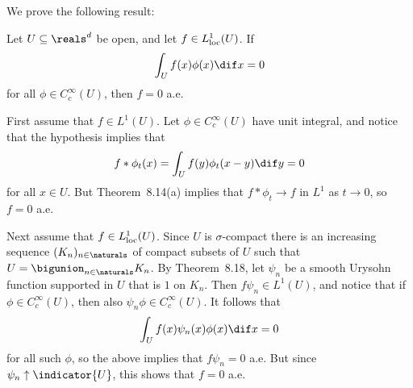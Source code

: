 \documentclass[article, a4paper, 11pt, oneside]{memoir}
\numberwithin{equation}{chapter}
\newenvironment{displaytheorem}{%
	\begin{displayquote}\itshape%
}{%
	\end{displayquote}%
}
\theoremstyle{nonumberplain}
\begin{document}
\begin{remarkbreak}
	We prove the following result:
	\begin{displaytheorem}
		Let $U \subseteq \reals^d$ be open, and let $f \in L^1_{\mathrm{loc}}(U)$. If
		\begin{equation*}
			\int_U f(x) \phi(x) \dif x
				= 0
		\end{equation*}
		for all $\phi \in C_c^\infty(U)$, then $f = 0$ a.e.
	\end{displaytheorem}
	First assume that $f \in L^1(U)$. Let $\phi \in C_c^\infty(U)$ have unit integral, and notice that the hypothesis implies that
	\begin{equation*}
		f * \phi_t(x)
			= \int_U f(y) \phi_t(x - y) \dif y
			= 0
	\end{equation*}
	for all $x \in U$. But Theorem~8.14(a) implies that $f * \phi_t \to f$ in $L^1$ as $t \to 0$, so $f = 0$ a.e.

	Next assume that $f \in L^1_{\mathrm{loc}}(U)$. Since $U$ is $\sigma$-compact there is an increasing sequence $(K_n)_{n \in \naturals}$ of compact subsets of $U$ such that $U = \bigunion_{n \in \naturals} K_n$. By Theorem~8.18, let $\psi_n$ be a smooth Urysohn function supported in $U$ that is $1$ on $K_n$. Then $f \psi_n \in L^1(U)$, and notice that if $\phi \in C_c^\infty(U)$, then also $\psi_n \phi \in C_c^\infty(U)$. It follows that
	\begin{equation*}
		\int_U f(x) \psi_n(x) \phi(x) \dif x
			= 0
	\end{equation*}
	for all such $\phi$, so the above implies that $f \psi_n = 0$ a.e. But since $\psi_n \uparrow \indicator{U}$, this shows that $f = 0$ a.e.
\end{remarkbreak}
\end{document}
